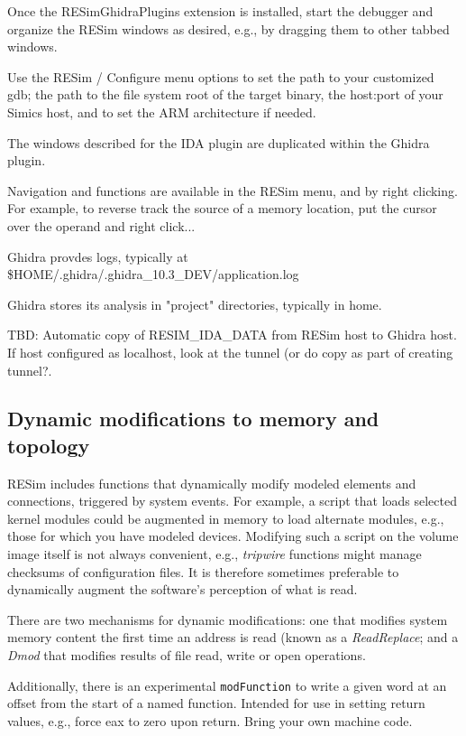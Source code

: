 \documentclass[titlepage]{article}
\begin{document}
Once the RESimGhidraPlugins extension is installed, start the debugger and organize the RESim windows
as desired, e.g., by dragging them to other tabbed windows.

Use the RESim / Configure menu options to set the path to your customized gdb; the path to
the file system root of the target binary, the host:port of your Simics host, and to set the ARM architecture if needed.

The windows described for the IDA plugin are duplicated within the Ghidra plugin.

Navigation and functions are available in the RESim menu, and by right clicking.  For example, to reverse track
the source of a memory location, put the cursor over the operand and right click...

Ghidra provdes logs, typically at \$HOME/.ghidra/.ghidra\_10.3\_DEV/application.log

Ghidra stores its analysis in "project" directories, typically in home.

TBD: Automatic copy of RESIM\_IDA\_DATA from RESim host to Ghidra host.  If host configured as localhost, look
at the tunnel (or do copy as part of creating tunnel?.  



\subsection{Dynamic modifications to memory and topology}
\label{dmod}
RESim includes functions that dynamically modify modeled elements and connections,
triggered by system events.  For example, a script that loads selected kernel modules could be augmented in memory to
load alternate modules, e.g., those for which you have modeled devices.  Modifying such a script on the volume
image itself is not always convenient, e.g., \textit{tripwire} functions might manage checksums of
configuration files.  It is therefore sometimes preferable to dynamically augment the software's perception of what is read.

There are two mechanisms for dynamic modifications: one that modifies system memory content the first time an address is
read (known as a \textit{ReadReplace}; and a \textit{Dmod} that modifies results of file read, write or open operations.

Additionally, there is an experimental {\tt modFunction} to write a given word at an offset from the start of a named function.  
Intended for use in setting return values, e.g., force eax to zero upon return.  Bring your own machine code.  
\end{document}
